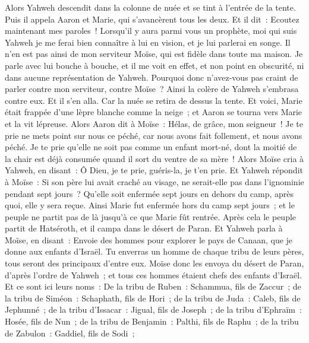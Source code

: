 \begin{multicols}{2}
Alors Yahweh descendit dans la colonne de nuée et se tint à l'entrée de la tente. Puis il appela Aaron et Marie, qui s'avancèrent tous les deux.
Et il dit~: Ecoutez maintenant mes paroles~! Lorsqu'il y aura parmi vous un prophète, moi qui suis Yahweh je me ferai bien connaître à lui en vision, et je lui parlerai en songe.
Il n'en est pas ainsi de mon serviteur Moïse, qui est fidèle dans toute ma maison.
Je parle avec lui bouche à bouche, et il me voit en effet, et non point en obscurité, ni dans aucune représentation de Yahweh. Pourquoi donc n'avez-vous pas craint de parler contre mon serviteur, contre Moïse~?
Ainsi la colère de Yahweh s'embrasa contre eux. Et il s'en alla.
Car la nuée se retira de dessus la tente. Et voici, Marie était frappée d'une lèpre blanche comme la neige~; et Aaron se tourna vers Marie et la vit lépreuse.
Alors Aaron dit à Moïse~: Hélas, de grâce, mon seigneur~! Je te prie ne mets point sur nous ce péché, car nous avons fait follement, et nous avons péché.
Je te prie qu'elle ne soit pas comme un enfant mort-né, dont la moitié de la chair est déjà consumée quand il sort du ventre de sa mère~!
Alors Moïse cria à Yahweh, en disant~: Ô Dieu, je te prie, guéris-la, je t'en prie.
Et Yahweh répondit à Moïse~: Si son père lui avait craché au visage, ne serait-elle pas dans l'ignominie pendant sept jours~? Qu'elle soit enfermée sept jours en dehors du camp, après quoi, elle y sera reçue.
Ainsi Marie fut enfermée hors du camp sept jours~; et le peuple ne partit pas de là jusqu'à ce que Marie fût rentrée.
Après cela le peuple partit de Hatséroth, et il campa dans le désert de Paran.
\VerseOne{}Et Yahweh parla à Moïse, en disant~:
Envoie des hommes pour explorer le pays de Canaan, que je donne aux enfants d'Israël. Tu enverras un homme de chaque tribu de leurs pères, tous seront des principaux d'entre eux.
Moïse donc les envoya du désert de Paran, d'après l'ordre de Yahweh~; et tous ces hommes étaient chefs des enfants d'Israël.
Et ce sont ici leurs noms~: De la tribu de Ruben~: Schammua, fils de Zaccur~;
de la tribu de Siméon~: Schaphath, fils de Hori~;
de la tribu de Juda~: Caleb, fils de Jephunné~;
de la tribu d'Issacar~: Jigual, fils de Joseph~;
de la tribu d'Ephraïm~: Hosée, fils de Nun~;
de la tribu de Benjamin~: Palthi, fils de Raphu~;
de la tribu de Zabulon~: Gaddiel, fils de Sodi~;

\end{multicols}
